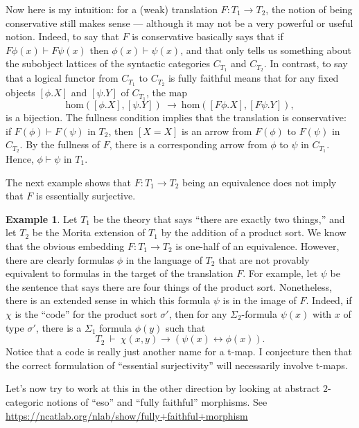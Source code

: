 \documentclass[12pt]{article}
\theoremstyle{definition}
\newtheorem{example}[prop]{Example}
\theoremstyle{remark}
\newcommand{\3}{\mathcal}
\begin{document}
Now here is my intuition: for a (weak) translation $F:T_1\to T_2$, the
notion of being conservative still makes sense --- although it may not
be a very powerful or useful notion. Indeed, to say that $F$ is
conservative basically says that if $F\phi (x)\vdash F\psi (x)$ then
$\phi (x)\vdash\psi (x)$, and that only tells us something about the
subobject lattices of the syntactic categories $C_{T_1}$ and
$C_{T_2}$. In contrast, to say that a logical functor from $C_{T_1}$
to $C_{T_2}$ is fully faithful means that for any fixed objects
$[\phi .X]$ and $[\psi .Y]$ of $C_{T_1}$, the map
\[ \mathrm{hom}\left( [\phi .X] ,[\psi .Y]\right) \: \to \:
  \mathrm{hom}\left( [F\phi .X] ,[F\psi .Y]\right) ,\] is a
bijection. The fullness condition implies that the translation is
conservative: if $F(\phi )\vdash F(\psi )$ in $T_2$, then $[X=X]$ is
an arrow from $F(\phi )$ to $F(\psi )$ in $C_{T_2}$. By the fullness
of $F$, there is a corresponding arrow from $\phi$ to $\psi$ in
$C_{T_1}$. Hence, $\phi\vdash\psi$ in $T_1$.

The next example shows that $F:T_1\to T_2$ being an equivalence does
not imply that $F$ is essentially surjective.

\begin{example} Let $T_1$ be the theory that says ``there are exactly
  two things,'' and let $T_2$ be the Morita extension of $T_1$ by the
  addition of a product sort. We know that the obvious embedding
  $F:T_1\to T_2$ is one-half of an equivalence. However, there are
  clearly formulas $\phi$ in the language of $T_2$ that are not
  provably equivalent to formulas in the target of the translation
  $F$. For example, let $\psi$ be the sentence that says there are
  four things of the product sort. Nonetheless, there is an extended
  sense in which this formula $\psi$ is in the image of $F$. Indeed,
  if $\chi$ is the ``code'' for the product sort $\sigma '$, then for
  any $\Sigma _2$-formula $\psi (x)$ with $x$ of type $\sigma '$,
  there is a $\Sigma _1$ formula $\phi (y)$ such that
  \[ T_2\: \vdash \: \chi (x,y)\to (\psi (x)\leftrightarrow \phi (x))
    .\] Notice that a code is really just another name for a t-map. I
  conjecture then that the correct formulation of ``essential
  surjectivity'' will necessarily involve t-maps. \end{example}

Let's now try to work at this in the other direction by looking at
abstract $2$-categoric notions of ``eso'' and ``fully faithful''
morphisms. See
\url{https://ncatlab.org/nlab/show/fully+faithful+morphism}
\end{document}
